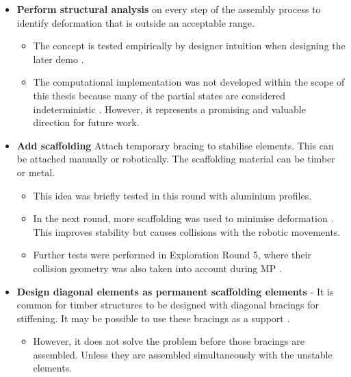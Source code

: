 \begin{itemize}
    \item \textbf{Perform structural analysis} on every step of the assembly process to identify deformation that is outside an acceptable range.
    \begin{itemize}
        \item The concept is tested empirically by designer intuition when designing the later demo .
        \item The computational implementation was not developed within the scope of this thesis because many of the partial states are considered indeterministic . However, it represents a promising and valuable direction for future work.
    \end{itemize}
    
    \item \textbf{Add scaffolding} Attach temporary bracing to stabilise elements. This can be attached manually or robotically. The scaffolding material can be timber or metal. 
    \begin{itemize}
        \item This idea was briefly tested in this round with aluminium profiles.
        \item In the next round, more scaffolding was used to minimise deformation . This improves stability but causes collisions with the robotic movements. 
        \item Further tests were performed in Exploration Round 5, where their collision geometry was also taken into account during MP . 
    \end{itemize}
    
    \item \textbf{Design diagonal elements as permanent scaffolding elements} - It is common for timber structures to be designed with diagonal bracings for stiffening. It may be possible to use these bracings as a support .
    \begin{itemize}
        \item However, it does not solve the problem before those bracings are assembled. Unless they are assembled simultaneously with the unstable elements.
    \end{itemize}
    

\end{itemize}
